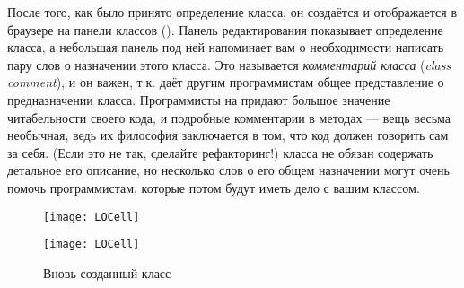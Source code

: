 \documentclass[a4paper,10pt,twoside]{book}
\begin{document}
После того, как было принято определение класса, он создаётся и отображается в браузере на панели классов ().
Панель редактирования показывает определение класса, а небольшая панель под ней напоминает вам о необходимости написать пару слов о назначении этого класса. Это называется \emph{комментарий класса} (\emph{class comment}), и он важен, т.к. даёт другим программистам общее представление о предназначении класса.
Программисты на \st придают большое значение читабельности своего кода, и подробные комментарии в методах --- вещь весьма необычная, ведь их философия заключается в том, что код должен говорить сам за себя. (Если это не так, сделайте рефакторинг!)  класса не обязан содержать детальное его описание, но несколько слов о его общем назначении могут очень помочь программистам, которые потом будут иметь дело с вашим классом.


\begin{figure}[h!t]
\ifluluelse
	{\centerline {\texttt{[image: LOCell]}}}
	{\centerline {\texttt{[image: LOCell]}}}
\caption{Вновь созданный класс }
\end{figure}

\end{document}
